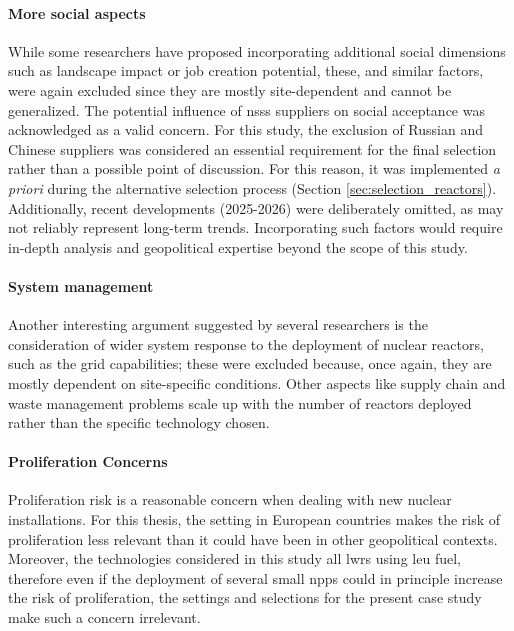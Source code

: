 \paragraph{More social aspects}
While some researchers have proposed incorporating additional social dimensions such as landscape impact or job creation potential, these, and similar factors, were again excluded since they are mostly site-dependent and cannot be generalized. The potential influence of \gls{nsss} suppliers on social acceptance was acknowledged as a valid concern. For this study, the exclusion of Russian and Chinese suppliers was considered an essential requirement for the final selection rather than a possible point of discussion. For this reason, it was implemented \textit{a priori} during the alternative selection process (Section \ref{sec:selection_reactors}). Additionally, recent developments (2025-2026) were deliberately omitted, as may not reliably represent long-term trends. Incorporating such factors would require in-depth analysis and geopolitical expertise beyond the scope of this study.

\paragraph{System management}
Another interesting argument suggested by several researchers is the consideration of wider system response to the deployment of nuclear reactors, such as the grid capabilities; these were excluded because, once again, they are mostly dependent on site-specific conditions. Other aspects like supply chain and waste management problems scale up with the number of reactors deployed rather than the specific technology chosen.

\paragraph{Proliferation Concerns}
Proliferation risk is a reasonable concern when dealing with new nuclear installations. For this thesis, the setting in European countries makes the risk of proliferation less relevant than it could have been in other geopolitical contexts. Moreover, the technologies considered in this study all \glspl{lwr} using \gls{leu} fuel, therefore even if the deployment of several small \glspl{npp} could in principle increase the risk of proliferation, the settings and selections for the present case study make such a concern irrelevant.